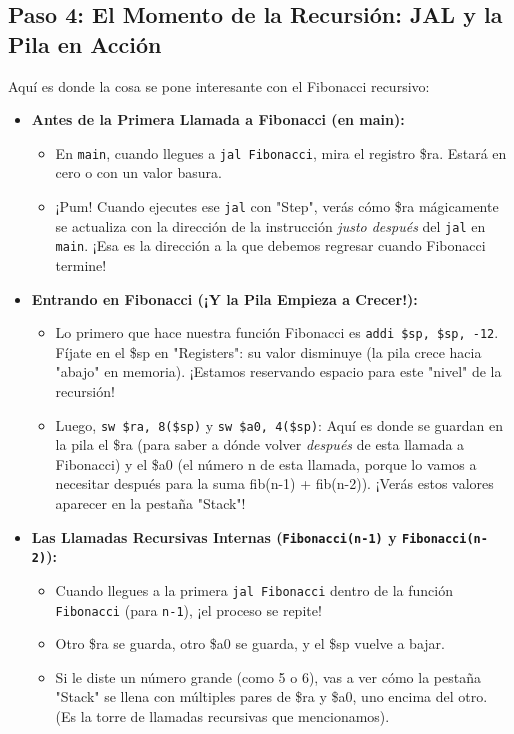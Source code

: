 \documentclass{article}
\begin{document}
\subsection*{Paso 4: El Momento de la Recursión: JAL y la Pila en Acción}
Aquí es donde la cosa se pone interesante con el Fibonacci recursivo:
\begin{itemize}
    \item \textbf{Antes de la Primera Llamada a Fibonacci (en main):}
    \begin{itemize}
        \item En \texttt{main}, cuando llegues a \texttt{jal Fibonacci}, mira el registro \$ra. Estará en cero o con un valor basura.
        \item ¡Pum! Cuando ejecutes ese \texttt{jal} con "Step", verás cómo \$ra mágicamente se actualiza con la dirección de la instrucción \textit{justo después} del \texttt{jal} en \texttt{main}. ¡Esa es la dirección a la que debemos regresar cuando Fibonacci termine!
    \end{itemize}
    \item \textbf{Entrando en Fibonacci (¡Y la Pila Empieza a Crecer!):}
    \begin{itemize}
        \item Lo primero que hace nuestra función Fibonacci es \texttt{addi \$sp, \$sp, -12}. Fíjate en el \$sp en "Registers": su valor disminuye (la pila crece hacia "abajo" en memoria). ¡Estamos reservando espacio para este "nivel" de la recursión!
        \item Luego, \texttt{sw \$ra, 8(\$sp)} y \texttt{sw \$a0, 4(\$sp)}: Aquí es donde se guardan en la pila el \$ra (para saber a dónde volver \textit{después} de esta llamada a Fibonacci) y el \$a0 (el número n de esta llamada, porque lo vamos a necesitar después para la suma fib(n-1) + fib(n-2)). ¡Verás estos valores aparecer en la pestaña "Stack"!
    \end{itemize}
    \item \textbf{Las Llamadas Recursivas Internas (\texttt{Fibonacci(n-1)} y \texttt{Fibonacci(n-2)}):}
    \begin{itemize}
        \item Cuando llegues a la primera \texttt{jal Fibonacci} dentro de la función \texttt{Fibonacci} (para \texttt{n-1}), ¡el proceso se repite!
        \item Otro \$ra se guarda, otro \$a0 se guarda, y el \$sp vuelve a bajar.
        \item Si le diste un número grande (como 5 o 6), vas a ver cómo la pestaña "Stack" se llena con múltiples pares de \$ra y \$a0, uno encima del otro. (Es la torre de llamadas recursivas que mencionamos).

\end{itemize}
\end{itemize}
\end{document}
